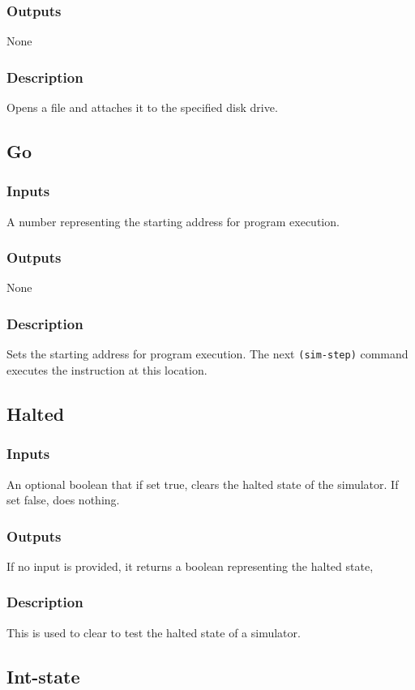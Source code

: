\documentclass[10pt, openany]{book}
\begin{document}
\subsubsection{Outputs}
None
\subsubsection{Description}
Opens a file and attaches it to the specified disk drive.

\subsection{Go}
\subsubsection{Inputs}
A number representing the starting address for program execution.
\subsubsection{Outputs}
None
\subsubsection{Description}
Sets the starting address for program execution.  The next \verb|(sim-step)| command executes the instruction at this location.

\subsection{Halted}
\subsubsection{Inputs}
An optional boolean that if set true, clears the halted state of the simulator.  If set false, does nothing.
\subsubsection{Outputs}
If no input is provided, it returns a boolean representing the halted state, 
\subsubsection{Description}
This is used to clear to test the halted state of a simulator.

\subsection{Int-state}
\end{document}
